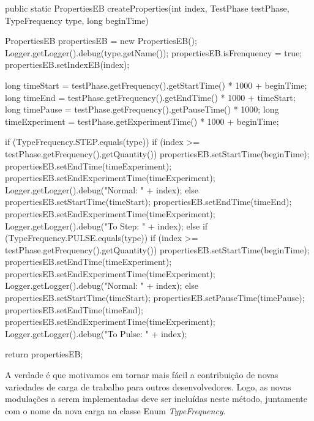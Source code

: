 \begin{codigo}[caption={Algoritmo calcula os tempos de iniciaçização e termino para cada um dos Clientes}, label={code:createProperties}, breaklines=true]
	public static PropertiesEB createProperties(int index, TestPhase testPhase, TypeFrequency type, long beginTime) {
		
		PropertiesEB propertiesEB = new PropertiesEB();
		Logger.getLogger().debug(type.getName());
		propertiesEB.isFrenquency = true;
		propertiesEB.setIndexEB(index);
		
		long timeStart = testPhase.getFrequency().getStartTime() * 1000 + beginTime;
		long timeEnd   = testPhase.getFrequency().getEndTime() * 1000 + timeStart;
		long timePause = testPhase.getFrequency().getPauseTime() * 1000;
		long timeExperiment = testPhase.getExperimentTime() * 1000 + beginTime;
		
		if (TypeFrequency.STEP.equals(type)) {
			if (index >= testPhase.getFrequency().getQuantity()) {
				propertiesEB.setStartTime(beginTime);
				propertiesEB.setEndTime(timeExperiment);
				propertiesEB.setEndExperimentTime(timeExperiment);
				Logger.getLogger().debug("Normal: " + index);
			} else {
				propertiesEB.setStartTime(timeStart);
				propertiesEB.setEndTime(timeEnd);
				propertiesEB.setEndExperimentTime(timeExperiment);
				Logger.getLogger().debug("To Step: " + index);
			}
		} else if (TypeFrequency.PULSE.equals(type)) {
			if (index >= testPhase.getFrequency().getQuantity()) {
				propertiesEB.setStartTime(beginTime);
				propertiesEB.setEndTime(timeExperiment);
				propertiesEB.setEndExperimentTime(timeExperiment);
				Logger.getLogger().debug("Normal: " + index);
			} else {
				propertiesEB.setStartTime(timeStart);
				propertiesEB.setPauseTime(timePause);
				propertiesEB.setEndTime(timeEnd);
				propertiesEB.setEndExperimentTime(timeExperiment);
				Logger.getLogger().debug("To Pulse: " + index);
			}
		}

		return propertiesEB;

	}

\end{codigo}
A verdade é que motivamos em tornar mais fácil a contribuição de novas variedades de carga de trabalho para outros desenvolvedores. Logo, as novas modulações a serem implementadas deve ser incluídas neste método, juntamente com o nome da nova carga na classe Enum \textit{TypeFrequency}.


